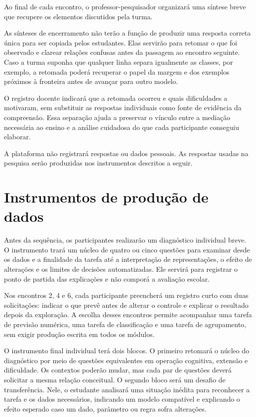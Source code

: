 Ao final de cada encontro, o professor-pesquisador organizará uma síntese breve que recupere os elementos discutidos pela turma.

As sínteses de encerramento não terão a função de produzir uma resposta correta única para ser copiada pelos estudantes. Elas servirão para retomar o que foi observado e clarear relações confusas antes da passagem ao encontro seguinte. Caso a turma suponha que qualquer linha separa igualmente as classes, por exemplo, a retomada poderá recuperar o papel da margem e dos exemplos próximos à fronteira antes de avançar para outro modelo.

O registro docente indicará que a retomada ocorreu e quais dificuldades a motivaram, sem substituir as respostas individuais como fonte de evidência da compreensão. Essa separação ajuda a preservar o vínculo entre a mediação necessária ao ensino e a análise cuidadosa do que cada participante conseguiu elaborar.

A plataforma não registrará respostas ou dados pessoais. As respostas usadas na pesquisa serão produzidas nos instrumentos descritos a seguir.

\section{Instrumentos de produção de dados}

Antes da sequência, os participantes realizarão um diagnóstico individual breve. O instrumento trará um núcleo de quatro ou cinco questões para examinar desde os dados e a finalidade da tarefa até a interpretação de representações, o efeito de alterações e os limites de decisões automatizadas. Ele servirá para registrar o ponto de partida das explicações e não comporá a avaliação escolar.

Nos encontros 2, 4 e 6, cada participante preencherá um registro curto com duas solicitações: indicar o que prevê antes de alterar o controle e explicar o resultado depois da exploração. A escolha desses encontros permite acompanhar uma tarefa de previsão numérica, uma tarefa de classificação e uma tarefa de agrupamento, sem exigir produção escrita em todos os módulos.

O instrumento final individual terá dois blocos. O primeiro retomará o núcleo do diagnóstico por meio de questões equivalentes em operação cognitiva, extensão e dificuldade. Os contextos poderão mudar, mas cada par de questões deverá solicitar a mesma relação conceitual. O segundo bloco será um desafio de transferência. Nele, o estudante analisará uma situação inédita para reconhecer a tarefa e os dados necessários, indicando um modelo compatível e explicando o efeito esperado caso um dado, parâmetro ou regra sofra alterações.

